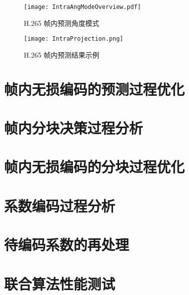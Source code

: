 \begin{figure}[hbt]
    \centering
    \texttt{[image: IntraAngModeOverview.pdf]}
    \caption{H.265 帧内预测角度模式}
    \label{fig:IntraAngModeOverview}
\end{figure}

\begin{figure}[hbt]
    \centering
    \texttt{[image: IntraProjection.png]}
    \caption{H.265 帧内预测结果示例}
    \label{fig:IntraProjection}
\end{figure}

\section{帧内无损编码的预测过程优化}

\section{帧内分块决策过程分析}

\section{帧内无损编码的分块过程优化}

\section{系数编码过程分析}

\section{待编码系数的再处理}

\section{联合算法性能测试}